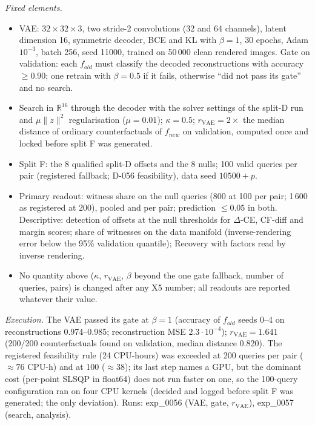 \documentclass[10pt,a4paper]{article}
\theoremstyle{remark}
\newcommand{\norm}[1]{\lVert #1\rVert}
\newcommand{\DCE}{$\Delta$-CE}
\begin{document}
\emph{Fixed elements.}
\begin{itemize}
\item VAE: $32\times32\times3$, two stride-2 convolutions (32 and 64 channels), latent dimension 16, symmetric decoder, BCE and KL with $\beta=1$, 30 epochs, Adam $10^{-3}$, batch 256, seed 11000, trained on 50\,000 clean rendered images. Gate on validation: each $f_{old}$ must classify the decoded reconstructions with accuracy $\ge0.90$; one retrain with $\beta=0.5$ if it fails, otherwise ``did not pass its gate'' and no search.
\item Search in $\mathbb R^{16}$ through the decoder with the solver settings of the split-D run and $\mu\norm z^2$ regularisation ($\mu=0.01$); $\kappa=0.5$; $r_{\mathrm{VAE}}=2\times$ the median distance of ordinary counterfactuals of $f_{new}$ on validation, computed once and locked before split F was generated.
\item Split F: the 8 qualified split-D offsets and the 8 nulls; 100 valid queries per pair (registered fallback; D-056 feasibility), data seed $10500+p$.
\item Primary readout: witness share on the null queries (800 at 100 per pair; 1\,600 as registered at 200), pooled and per pair; prediction $\le0.05$ in both. Descriptive: detection of offsets at the null thresholds for \DCE, CF-diff and margin scores; share of witnesses on the data manifold (inverse-rendering error below the 95\% validation quantile); Recovery with factors read by inverse rendering.
\item No quantity above ($\kappa$, $r_{\mathrm{VAE}}$, $\beta$ beyond the one gate fallback, number of queries, pairs) is changed after any X5 number; all readouts are reported whatever their value.
\end{itemize}

\emph{Execution.} The VAE passed its gate at $\beta=1$ (accuracy of $f_{old}$ seeds 0--4 on reconstructions 0.974--0.985; reconstruction MSE $2.3\cdot10^{-4}$); $r_{\mathrm{VAE}}=1.641$ (200/200 counterfactuals found on validation, median distance 0.820). The registered feasibility rule (24 CPU-hours) was exceeded at 200 queries per pair ($\approx76$ CPU-h) and at 100 ($\approx38$); its last step names a GPU, but the dominant cost (per-point SLSQP in float64) does not run faster on one, so the 100-query configuration ran on four CPU kernels (decided and logged before split F was generated; the only deviation). Runs: exp\_0056 (VAE, gate, $r_{\mathrm{VAE}}$), exp\_0057 (search, analysis).
\end{document}
